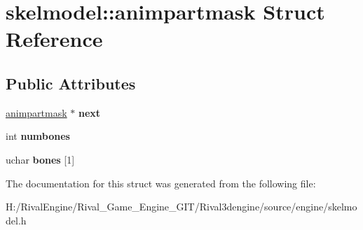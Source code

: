 \hypertarget{structskelmodel_1_1animpartmask}{}\section{skelmodel\+:\+:animpartmask Struct Reference}
\label{structskelmodel_1_1animpartmask}
\subsection*{Public Attributes}
\begin{DoxyCompactItemize}
\item 
\mbox{\label{structskelmodel_1_1animpartmask_aa58b9140ef3f62c955c9fc145d1213f8}} 
\hyperlink{structskelmodel_1_1animpartmask}{animpartmask} $\ast$ {\bfseries next}
\item 
\mbox{\label{structskelmodel_1_1animpartmask_a0286cde18fcb4ebe8c94a271126fb7f9}} 
int {\bfseries numbones}
\item 
\mbox{\label{structskelmodel_1_1animpartmask_ae891651a4368e0766a6a29750fb4d9ba}} 
uchar {\bfseries bones} \mbox{[}1\mbox{]}
\end{DoxyCompactItemize}


The documentation for this struct was generated from the following file\+:\begin{DoxyCompactItemize}
\item 
H\+:/\+Rival\+Engine/\+Rival\+\_\+\+Game\+\_\+\+Engine\+\_\+\+G\+I\+T/\+Rival3dengine/source/engine/skelmodel.\+h\end{DoxyCompactItemize}
